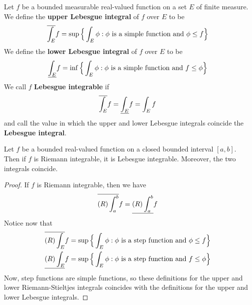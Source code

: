 \begin{definition}
    Let $f$ be a bounded measurable real-valued function on a set  $E$ of finite
    measure. We define the  \textbf{upper Lebesgue integral} of $f$ over  $E$ to
    be
    \begin{equation*}
        \bar{\int_E}{f}=\sup{\Big{\{} \int_E{\phi} : \phi \text{ is a simple
                    function and } \phi \leq f \Big\}{}}
    \end{equation*}
    We define the \textbf{lower Lebesgue integral} of $f$ over  $E$ to be
    \begin{equation*}
        \bbar{\int_E}{f}=\inf{\Big{\{} \int_E{\phi} : \phi \text{ is a simple
                    function and } f \leq \phi \Big\}{}}
    \end{equation*}
    We call $f$  \textbf{Lebesgue integrable} if
    \begin{equation*}
        \bar{\int_E}{f}=\bbar{\int_E}{f}=\int_E{f}
    \end{equation*}
    and call the value in which the upper and lower Lebesgue integrals coincide
    the \textbf{Lebesgue integral}.
\end{definition}

\begin{theorem}\label{10.1.3}
    Let $f$ be a bounded real-valued function on a closed bounded interval
    $[a,b]$. Then if $f$ is Riemann integrable, it is Lebesgue integrable.
    Moreover, the two integrals coincide.
\end{theorem}
\begin{proof}
    If $f$ is Riemann integrable, then we have
    \begin{equation*}
        \bar{(R)\int_a^b}{f}=\bbar{(R)\int_a^b}{f}
    \end{equation*}
    Notice now that
    \begin{align*}
        \bar{(R)\int_E}{f} &=  \sup{\Big{\{} \int_E{\phi} : \phi \text{ is a
                    step function and } \phi \leq f \Big\}{}}   \\
        \bbar{(R)\int_E}{f} &=  \sup{\Big{\{} \int_E{\phi} : \phi \text{ is a
                    step function and } f \leq \phi \Big\}{}}   \\
    \end{align*}
    Now, step functions are simple functions, so these definitions for the upper
    and lower Riemann-Stieltjes integrals coincides with the definitions for the
    upper and lower Lebesgue integrals.
\end{proof}

